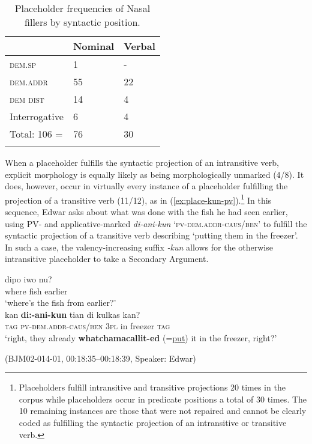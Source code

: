 \documentclass[output=paper,colorlinks,citecolor=brown
\ChapterDOI{10.5281/zenodo.15697585}
]{langscibook}
\begin{document}
\begin{table}
    \caption{Placeholder frequencies of Nasal fillers by syntactic position.}
    \label{tab:billings:place-rep-rep}
    \begin{tabularx}{.8\textwidth}{lYY}
        \lsptoprule
        & {Nominal} & {Verbal} \\\midrule
        \textsc{dem.sp} & 1 & - \\
        \textsc{dem.addr} & 55 & 22 \\
        \textsc{dem dist} & 14 & 4 \\
        Interrogative & 6 & 4 \\\midrule
        Total: 106 =  & 76 & 30 \\
        \lspbottomrule
    \end{tabularx}
\end{table}

When a placeholder fulfills the syntactic projection of an intransitive verb, explicit morphology is equally likely as being morphologically unmarked (4/8). It does, however, occur in virtually every instance of a placeholder fulfilling the projection of a transitive verb (11/12), as in (\ref{ex:place-kun-pv}).\footnote{Placeholders fulfill intransitive and transitive projections 20 times in the corpus while placeholders occur in predicate positions a total of 30 times. The 10 remaining instances are those that were not repaired and cannot be clearly coded as fulfilling the syntactic projection of an intransitive or transitive verb.} In this sequence, Edwar asks about what was done with the fish he had seen earlier, using PV- and applicative-marked  \textit{di-ani-kun} `\textsc{pv}-\textsc{dem.addr}-\textsc{caus/ben}' to fulfill the syntactic projection of a transitive verb describing `putting them in the freezer'. In such a case, the valency-increasing suffix \textit{-kun} allows for the otherwise intransitive placeholder to take a Secondary Argument.

\begin{exe}
    \ex\label{ex:place-kun-pv} \begin{xlist}[0\quad →A:]
         \gll
        dipo iwo nu? \\
        where fish earlier \\
        \glt `where's the fish from earlier?' \\
         \gll
        kan \textbf{di:-ani-kun} tian di kulkas kan? \\
        \textsc{tag} \textsc{pv}-\textsc{dem.addr}-\textsc{caus/ben} 3\textsc{pl} in freezer \textsc{tag} \\
        \glt `right, they already \textbf{whatchamacallit-ed} (=\uline{put}) it in the freezer, right?' \\
    \end{xlist}
    \hfill (BJM02-014-01, 00:18:35–00:18:39, Speaker: Edwar) 
\end{exe}
\end{document}
